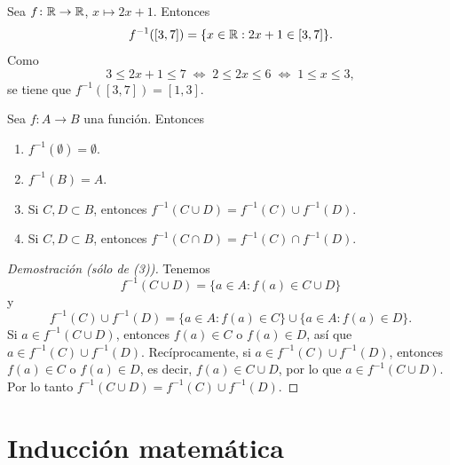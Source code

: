 \documentclass[12pt,a4paper]{book}
\begin{document}
    \begin{ejemplo}
        Sea $f\colon \mathbb{R} \to \mathbb{R}$, $x \mapsto 2x+1$. Entonces
        \begin{equation*}
            f^{-1}([3,7]) = \{x \in \mathbb{R} : 2x+1 \in [3,7]\}.
        \end{equation*}
        Como
        \begin{equation*}
            3 \le 2x+1 \le 7 \; \Longleftrightarrow \; 2 \le 2x \le 6 \; \Longleftrightarrow \; 1 \le x \le 3,
        \end{equation*}
        se tiene que $f^{-1}([3,7]) = [1,3]$.
    \end{ejemplo}

    \begin{proposicion}
        Sea $f\colon A \to B$ una función. Entonces
        \begin{enumerate}
            \item $f^{-1}(\emptyset) = \emptyset$.
            \item $f^{-1}(B) = A$.
            \item Si $C, D \subset B$, entonces $f^{-1}(C \cup D) = f^{-1}(C) \cup f^{-1}(D)$.
            \item Si $C, D \subset B$, entonces $f^{-1}(C \cap D) = f^{-1}(C) \cap f^{-1}(D)$.
        \end{enumerate}
    \end{proposicion}
    \begin{proof}[Demostración (sólo de (3))]
        Tenemos
        \begin{equation*}
            f^{-1}(C \cup D) = \{a \in A : f(a) \in C \cup D\}
        \end{equation*}
        y
        \begin{equation*}
            f^{-1}(C) \cup f^{-1}(D) = \{a \in A : f(a) \in C\} \cup \{a \in A : f(a) \in D\}.
        \end{equation*}
        Si $a \in f^{-1}(C \cup D)$, entonces $f(a) \in C$ o $f(a) \in D$, así que $a \in f^{-1}(C) \cup f^{-1}(D)$. Recíprocamente, si $a \in f^{-1}(C) \cup f^{-1}(D)$, entonces $f(a) \in C$ o $f(a) \in D$, es decir, $f(a) \in C \cup D$, por lo que $a \in f^{-1}(C \cup D)$. Por lo tanto $f^{-1}(C \cup D) = f^{-1}(C) \cup f^{-1}(D)$.
    \end{proof}

    \chapter{Inducción matemática}
    \label{chap:induccion}
\end{document}
